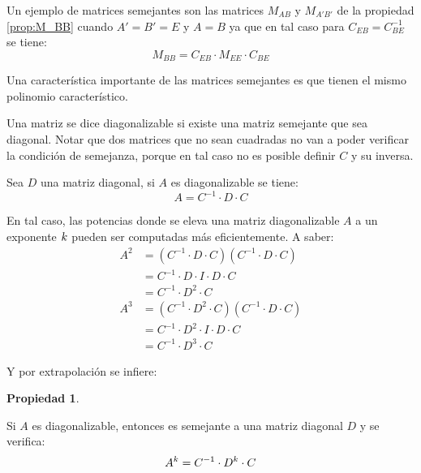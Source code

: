 \documentclass[a5paper,12pt,twoside]{book}
\newtheorem{prop}{{Propiedad}}[chapter]
\begin{document}
Un ejemplo de matrices semejantes son las matrices $M_{AB}$ y $M_{A'B'}$ de la propiedad \ref{prop:M_BB} cuando $A'=B'=E$ y $A=B$ ya que en tal caso para $C_{EB}=C_{BE}^{-1}$ se tiene:
\begin{equation*}
    M_{BB} = C_{EB} \cdot M_{EE} \cdot C_{BE}
\end{equation*}

Una característica importante de las matrices semejantes es que tienen el mismo polinomio característico.

Una matriz se dice diagonalizable si existe una matriz semejante que sea diagonal. Notar que dos matrices que no sean cuadradas no van a poder verificar la condición de semejanza, porque en tal caso no es posible definir $C$ y su inversa.

Sea $D$ una matriz diagonal, si $A$ es diagonalizable se tiene:
\begin{equation*}
    A = C^{-1} \cdot D \cdot C
\end{equation*}

En tal caso, las potencias donde se eleva una matriz diagonalizable $A$ a un exponente $k$ pueden ser computadas más eficientemente. A saber:
\begin{align*}
    A^2 &= \left( C^{-1} \cdot D \cdot C \right) \left( C^{-1} \cdot D \cdot C \right)
    \\
    &= C^{-1} \cdot D \cdot I \cdot D \cdot C
    \\
    &= C^{-1} \cdot D^2 \cdot C
    \\[1ex]
    A^3 &= \left( C^{-1} \cdot D^2 \cdot C \right) \left( C^{-1} \cdot D \cdot C \right)
    \\
    &= C^{-1} \cdot D^2 \cdot I \cdot D \cdot C
    \\
    &= C^{-1} \cdot D^3 \cdot C
\end{align*}

Y por extrapolación se infiere:

\begin{mdframed}[style=MyFrame1]
    \begin{prop}
    \end{prop}
    Si $A$ es diagonalizable, entonces es semejante a una matriz diagonal $D$ y se verifica:
    \begin{equation*}
        A^k = C^{-1} \cdot D^k \cdot C
    \end{equation*}
\end{mdframed}
\end{document}
